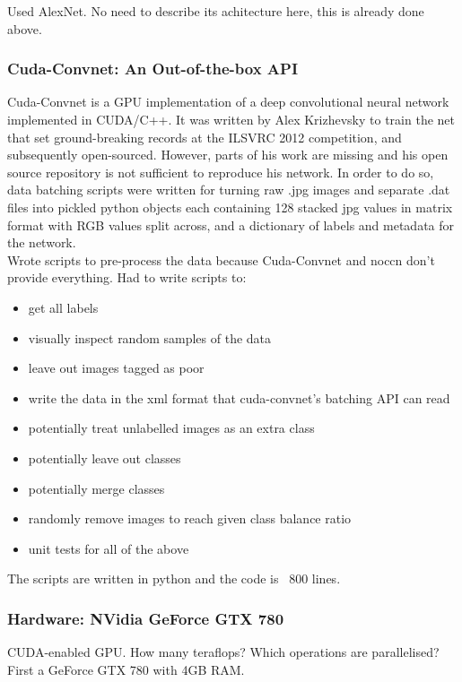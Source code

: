 \documentclass[a4paper,11pt]{article}
\begin{document}
Used AlexNet. No need to describe its achitecture here, this is already done above. \\

\subsubsection{Cuda-Convnet: An Out-of-the-box API}

Cuda-Convnet is a GPU implementation of a deep convolutional neural network implemented in CUDA/C++. It was written by Alex Krizhevsky to train the net that set ground-breaking records at the ILSVRC 2012 competition, and subsequently open-sourced. However, parts of his work are missing and his open source repository is not sufficient to reproduce his network. In order to do so, data batching scripts were written for turning raw .jpg images and separate .dat files into pickled python objects each containing 128 stacked jpg values in matrix format with RGB values split across, and a dictionary of labels and metadata for the network. \\

Wrote scripts to pre-process the data because Cuda-Convnet and noccn don't provide everything. Had to write scripts to:
\begin{itemize}
\item get all labels
\item visually inspect random samples of the data
\item leave out images tagged as poor
\item write the data in the xml format that cuda-convnet's batching API can read
\item potentially treat unlabelled images as an extra class
\item potentially leave out classes 
\item potentially merge classes
\item randomly remove images to reach given class balance ratio
\item unit tests for all of the above
\end{itemize}
The scripts are written in python and the code is ~800 lines.


\subsubsection{Hardware: NVidia GeForce GTX 780}

CUDA-enabled GPU. How many teraflops? Which operations are parallelised? 
First a GeForce GTX 780 with 4GB RAM. 
\end{document}
